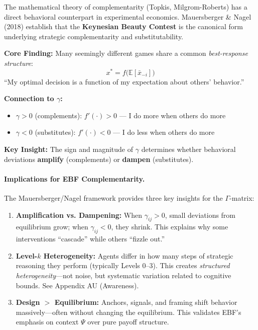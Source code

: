 The mathematical theory of complementarity (Topkis, Milgrom-Roberts) has a direct
behavioral counterpart in experimental economics. Mauersberger \& Nagel (2018)
establish that the \textbf{Keynesian Beauty Contest} is the canonical form underlying
strategic complementarity and substitutability.

\begin{tcolorbox}[colback=yellow!5!white, colframe=yellow!75!black,
    title=\textbf{Mauersberger \& Nagel (2018): Strategic Complementarity in Action}]

\textbf{Core Finding:}
Many seemingly different games share a common \textit{best-response structure}:
\[
x^* = f\bigl(\mathbb{E}[\bar{x}_{-i}]\bigr)
\]
``My optimal decision is a function of my expectation about others' behavior.''

\textbf{Connection to $\gamma$:}
\begin{itemize}[nosep]
    \item $\gamma > 0$ (complements): $f'(\cdot) > 0$ --- I do more when others do more
    \item $\gamma < 0$ (substitutes): $f'(\cdot) < 0$ --- I do less when others do more
\end{itemize}

\textbf{Key Insight:} The sign and magnitude of $\gamma$ determines whether
behavioral deviations \textbf{amplify} (complements) or \textbf{dampen} (substitutes).

\end{tcolorbox}

\paragraph{Implications for EBF Complementarity.}
The Mauersberger/Nagel framework provides three key insights for the $\Gamma$-matrix:

\begin{enumerate}[nosep]
    \item \textbf{Amplification vs. Dampening:} When $\gamma_{ij} > 0$, small deviations
    from equilibrium grow; when $\gamma_{ij} < 0$, they shrink. This explains why
    some interventions ``cascade'' while others ``fizzle out.''

    \item \textbf{Level-$k$ Heterogeneity:} Agents differ in how many steps of
    strategic reasoning they perform (typically Levels 0--3). This creates
    \textit{structured heterogeneity}---not noise, but systematic variation
    related to cognitive bounds. See Appendix AU (Awareness).

    \item \textbf{Design $>$ Equilibrium:} Anchors, signals, and framing shift
    behavior massively---often without changing the equilibrium. This validates
    EBF's emphasis on context $\Psi$ over pure payoff structure.
\end{enumerate}

